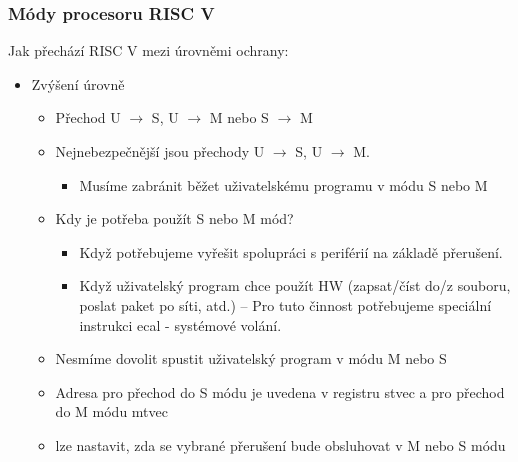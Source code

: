 \documentclass{beamer}
\begin{document}
\begin{frame}
\frametitle{Módy procesoru RISC V}

Jak přechází RISC V mezi úrovněmi ochrany:
\begin{itemize}
\item Zvýšení úrovně
\begin{itemize}
\item Přechod U $\rightarrow$ S, U $\rightarrow$ M nebo S $\rightarrow$ M
\item Nejnebezpečnější jsou přechody U $\rightarrow$ S, U $\rightarrow$ M.
\begin{itemize}
\item Musíme zabránit běžet uživatelskému programu v módu S nebo M
\end{itemize}
\item Kdy je potřeba použít S nebo M mód?
\begin{itemize}
\item Když potřebujeme vyřešit spolupráci s periférií na základě přerušení.
\item Když uživatelský program chce použít HW (zapsat/číst do/z souboru, poslat paket po síti, atd.) --
Pro tuto činnost potřebujeme speciální instrukci ecal - systémové volání.
\end{itemize}
\item Nesmíme dovolit spustit uživatelský program v módu M nebo S
\item Adresa pro přechod do S módu je uvedena v registru stvec a pro přechod do M módu mtvec
\item lze nastavit, zda se vybrané přerušení bude obsluhovat v M nebo S módu
\end{itemize}
\end{itemize}

\end{frame}
\end{document}
